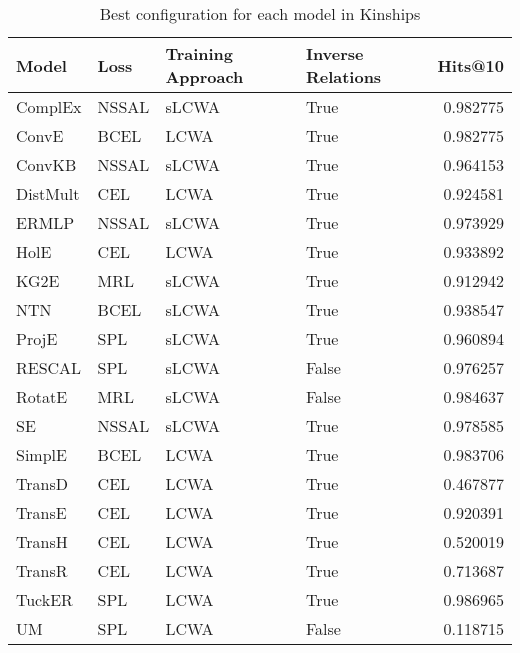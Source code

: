 \begin{table}
\centering
\caption{Best configuration for each model in Kinships}
\label{best_models_kinships}
\begin{tabular}{llllr}
\toprule
    Model &   Loss & Training Approach & Inverse Relations &   Hits@10 \\
\midrule
  ComplEx &  NSSAL &             sLCWA &              True &  0.982775 \\
    ConvE &   BCEL &              LCWA &              True &  0.982775 \\
   ConvKB &  NSSAL &             sLCWA &              True &  0.964153 \\
 DistMult &    CEL &              LCWA &              True &  0.924581 \\
    ERMLP &  NSSAL &             sLCWA &              True &  0.973929 \\
     HolE &    CEL &              LCWA &              True &  0.933892 \\
     KG2E &    MRL &             sLCWA &              True &  0.912942 \\
      NTN &   BCEL &             sLCWA &              True &  0.938547 \\
    ProjE &    SPL &             sLCWA &              True &  0.960894 \\
   RESCAL &    SPL &             sLCWA &             False &  0.976257 \\
   RotatE &    MRL &             sLCWA &             False &  0.984637 \\
       SE &  NSSAL &             sLCWA &              True &  0.978585 \\
   SimplE &   BCEL &              LCWA &              True &  0.983706 \\
   TransD &    CEL &              LCWA &              True &  0.467877 \\
   TransE &    CEL &              LCWA &              True &  0.920391 \\
   TransH &    CEL &              LCWA &              True &  0.520019 \\
   TransR &    CEL &              LCWA &              True &  0.713687 \\
   TuckER &    SPL &              LCWA &              True &  0.986965 \\
       UM &    SPL &              LCWA &             False &  0.118715 \\
\bottomrule
\end{tabular}
\end{table}


